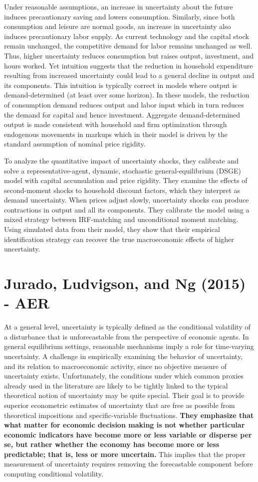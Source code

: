 \documentclass{article}
\begin{document}
{Under reasonable assumptions, an increase in uncertainty about the future induces precautionary saving and lowers consumption. Similarly, since both consumption and leisure are normal goods, an increase in uncertainty also induces precautionary labor supply. As current technology and the capital stock remain unchanged, the competitive demand for labor remains unchanged as well. Thus, higher uncertainty reduces consumption but raises output, investment, and hours worked. Yet intuition suggests that the reduction in household expenditure resulting from increased uncertainty could lead to a general decline in output and its components. This intuition is typically correct in models where output is demand-determined (at least over some horizon). In these models, the reduction of consumption demand reduces output and labor input which in turn reduces the demand for capital and hence investment. Aggregate demand-determined output is made consistent with household and firm optimization through endogenous movements in markups which in their model is driven by the standard assumption of nominal price rigidity.

To analyze the quantitative impact of uncertainty shocks, they calibrate and solve a representative-agent, dynamic, stochastic general-equilibrium (DSGE) model with capital accumulation and price rigidity. They examine the effects of second-moment shocks to household discount factors, which they interpret as demand uncertainty. When prices adjust slowly, uncertainty shocks can produce contractions in output and all its components. They calibrate the model using a mixed strategy between IRF-matching and unconditional moment matching. Using simulated data from their model, they show that their empirical identification strategy can recover the true macroeconomic effects of higher uncertainty. 


\section*{Jurado, Ludvigson, and Ng (2015) - AER}


At a general level, uncertainty is typically defined as the conditional volatility of a disturbance that is unforecastable from the perspective of economic agents. In general equilibrium settings, reasonable mechanisms imply a role for time-varying uncertainty. A challenge in empirically examining the behavior of uncertainty, and its relation to macroeconomic activity, since no objective measure of uncertainty exists. Unfortunately, the conditions under which common proxies already used in the literature are likely to be tightly linked to the typical theoretical notion of uncertainty may be quite special. Their goal is to provide superior econometric estimates of uncertainty that are free as possible from theoretical impositions and specific-variable fluctuations. \textbf{They emphasize that what matter for economic decision making is not whether particular economic indicators have become more or less variable or disperse per se, but rather whether the economy has become more or less predictable; that is, less or more uncertain.} This implies that the proper measurement of uncertainty requires removing the forecastable component before computing conditional volatility.

}
\end{document}
